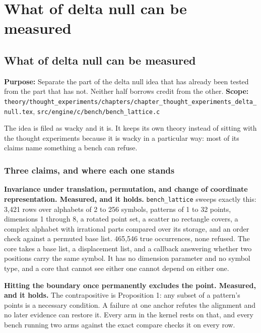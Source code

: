 \chapter{What of delta null can be measured}

\section{What of delta null can be measured}

\textbf{Purpose:} Separate the part of the delta null idea that has already been tested from the part that has not. Neither half borrows credit from the other. \textbf{Scope:} \texttt{theory/\allowbreak{}thought\_\allowbreak{}experiments/\allowbreak{}chapters/\allowbreak{}chapter\_\allowbreak{}thought\_\allowbreak{}experiments\_\allowbreak{}delta\_\allowbreak{}null.\allowbreak{}tex}, \texttt{src/\allowbreak{}engine/\allowbreak{}c/\allowbreak{}bench/\allowbreak{}bench\_\allowbreak{}lattice.\allowbreak{}c}

The idea is filed as wacky and it is. It keeps its own theory instead of sitting with the thought experiments because it is wacky in a particular way: most of its claims name something a bench can refuse.

\subsection{Three claims, and where each one stands}

\textbf{Invariance under translation, permutation, and change of coordinate representation. Measured, and it holds.} \texttt{bench\_\allowbreak{}lattice} sweeps exactly this: 3,421 rows over alphabets of 2 to 256 symbols, patterns of 1 to 32 points, dimensions 1 through 8, a rotated point set, a scatter no rectangle covers, a complex alphabet with irrational parts compared over its storage, and an order check against a permuted base list. 465,546 true occurrences, none refused. The core takes a base list, a displacement list, and a callback answering whether two positions carry the same symbol. It has no dimension parameter and no symbol type, and a core that cannot see either one cannot depend on either one.

\textbf{Hitting the boundary once permanently excludes the point. Measured, and it holds.} The contrapositive is Proposition 1: any subset of a pattern's points is a necessary condition. A failure at one anchor refutes the alignment and no later evidence can restore it. Every arm in the kernel rests on that, and every bench running two arms against the exact compare checks it on every row.

